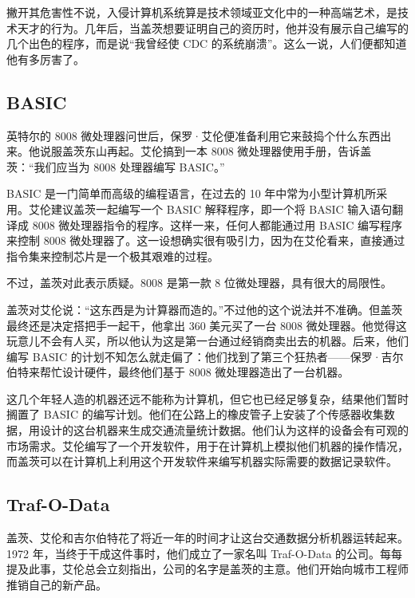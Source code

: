 \documentclass[12pt,UTF8]{ctexbook}
\begin{document}
撇开其危害性不说，入侵计算机系统算是技术领域亚文化中的一种高端艺术，是技术天才的行为。几年后，当盖茨想要证明自己的资历时，他并没有展示自己编写的几个出色的程序，而是说“我曾经使 CDC 的系统崩溃”。这么一说，人们便都知道他有多厉害了。





\subsection{BASIC}


英特尔的 8008 微处理器问世后，保罗·艾伦便准备利用它来鼓捣个什么东西出来。他说服盖茨东山再起。艾伦搞到一本 8008 微处理器使用手册，告诉盖茨：“我们应当为 8008 处理器编写 BASIC。”

BASIC 是一门简单而高级的编程语言，在过去的 10 年中常为小型计算机所采用。艾伦建议盖茨一起编写一个 BASIC 解释程序，即一个将 BASIC 输入语句翻译成 8008 微处理器指令的程序。这样一来，任何人都能通过用 BASIC 编写程序来控制 8008 微处理器了。这一设想确实很有吸引力，因为在艾伦看来，直接通过指令集来控制芯片是一个极其艰难的过程。

不过，盖茨对此表示质疑。8008 是第一款 8 位微处理器，具有很大的局限性。

盖茨对艾伦说：“这东西是为计算器而造的。”不过他的这个说法并不准确。但盖茨最终还是决定搭把手一起干，他拿出 360 美元买了一台 8008 微处理器。他觉得这玩意儿不会有人买，所以他认为这是第一台通过经销商卖出去的机器。后来，他们编写 BASIC 的计划不知怎么就走偏了：他们找到了第三个狂热者——保罗·吉尔伯特来帮忙设计硬件，最终他们基于 8008 微处理器造出了一台机器。

这几个年轻人造的机器还远不能称为计算机，但它也已经足够复杂，结果他们暂时搁置了 BASIC 的编写计划。他们在公路上的橡皮管子上安装了个传感器收集数据，用设计的这台机器来生成交通流量统计数据。他们认为这样的设备会有可观的市场需求。艾伦编写了一个开发软件，用于在计算机上模拟他们机器的操作情况，而盖茨可以在计算机上利用这个开发软件来编写机器实际需要的数据记录软件。





\subsection{Traf-O-Data}


盖茨、艾伦和吉尔伯特花了将近一年的时间才让这台交通数据分析机器运转起来。1972 年，当终于干成这件事时，他们成立了一家名叫 Traf-O-Data 的公司。每每提及此事，艾伦总会立刻指出，公司的名字是盖茨的主意。他们开始向城市工程师推销自己的新产品。
\end{document}
